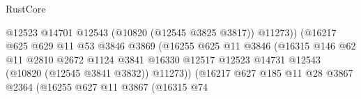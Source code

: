 \begin{lexlean}{RustCore}
\begin{coremodule}
                                                    @12523
                                                    @14701
                                                    @12543
                                                    (@10820 (@12545 @3825 @3817))
                                                    @11273))
                                                (@16217
                                                  @625
                                                  @629
                                                  @11
                                                  @53
                                                  @3846
                                                  @3869
                                                  (@16255
                                                    @625
                                                    @11
                                                    @3846
                                                    (@16315
                                                      @146
                                                      @62
                                                      @11
                                                      @2810
                                                      @2672
                                                      @1124
                                                      @3841
                                                      @16330
                                                      @12517
                                                      @12523
                                                      @14731
                                                      @12543
                                                      (@10820 (@12545 @3841 @3832))
                                                      @11273))
                                                  (@16217
                                                    @627
                                                    @185
                                                    @11
                                                    @28
                                                    @3867
                                                    @2364
                                                    (@16255
                                                      @627
                                                      @11
                                                      @3867
                                                      (@16315
                                                        @74

\end{coremodule}
\end{lexlean}
